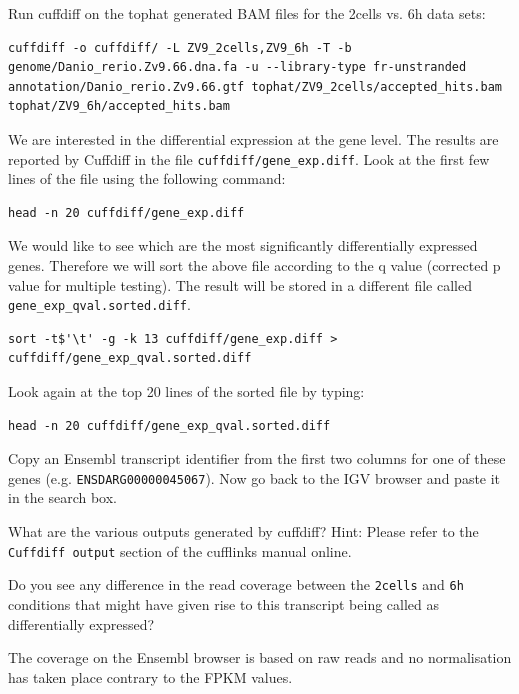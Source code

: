 \begin{bonus}
\begin{information}
\end{information}

\begin{steps}
Run cuffdiff on the tophat generated BAM files for the 2cells vs. 6h data sets:
\begin{lstlisting}
cuffdiff -o cuffdiff/ -L ZV9_2cells,ZV9_6h -T -b genome/Danio_rerio.Zv9.66.dna.fa -u --library-type fr-unstranded annotation/Danio_rerio.Zv9.66.gtf tophat/ZV9_2cells/accepted_hits.bam tophat/ZV9_6h/accepted_hits.bam
\end{lstlisting}
\end{steps}

\begin{steps}
We are interested in the differential expression at the gene level. The results
are reported by Cuffdiff in the file \texttt{cuffdiff/gene\_exp.diff}. 
Look at the first few lines of the file using the following command:
\begin{lstlisting}
head -n 20 cuffdiff/gene_exp.diff
\end{lstlisting}

We would like to see which are the most significantly differentially expressed
genes. Therefore we will sort the above file according to the q value
(corrected p value for multiple testing). The result will be stored in a
different file called \texttt{gene\_exp\_qval.sorted.diff}.
\begin{lstlisting}
sort -t$'\t' -g -k 13 cuffdiff/gene_exp.diff > cuffdiff/gene_exp_qval.sorted.diff
\end{lstlisting}

Look again at the top 20 lines of the sorted file by typing:
\begin{lstlisting}
head -n 20 cuffdiff/gene_exp_qval.sorted.diff
\end{lstlisting}
Copy an Ensembl transcript identifier from the first two columns for one of
these genes (e.g. \texttt{ENSDARG00000045067}). Now go back to the IGV browser
and paste it in the search box.
\end{steps}

\begin{questions}
What are the various outputs generated by cuffdiff?
Hint: Please refer to the \texttt{Cuffdiff output} section of the cufflinks manual online.

Do you see any difference in the read coverage between the \texttt{2cells} and
\texttt{6h} conditions that might have given rise to this transcript being
called as differentially expressed?
\begin{warning}
The coverage on the Ensembl browser is based on raw reads and no
normalisation has taken place contrary to the FPKM values.
\end{warning}


\end{questions}
\end{bonus}
